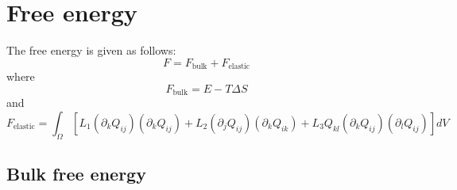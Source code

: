 \documentclass[reqno]{article}
\begin{document}
\section{Free energy}

The free energy is given as follows:
\begin{equation}
    F
    =
    F_\text{bulk}
    +
    F_\text{elastic}
\end{equation}
where
\begin{equation}
    F_\text{bulk}
    =
    E - T \Delta S
\end{equation}
and
\begin{equation}
    F_\text{elastic}
    =
    \int_\Omega
    \left[
        L_1 \left( \partial_k Q_{ij} \right) \left( \partial_k Q_{ij} \right)
        + L_2 \left( \partial_j Q_{ij} \right) \left( \partial_k Q_{ik} \right)
        + L_3 Q_{kl} \left( \partial_k Q_{ij} \right) \left( \partial_l Q_{ij} \right)
    \right]
    dV
\end{equation}

\subsection{Bulk free energy}
\end{document}
